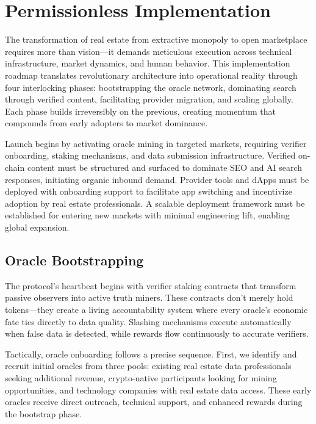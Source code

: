 \chapter{Permissionless Implementation}

The transformation of real estate from extractive monopoly to open marketplace requires more than vision---it demands meticulous execution across technical infrastructure, market dynamics, and human behavior. This implementation roadmap translates revolutionary architecture into operational reality through four interlocking phases: bootstrapping the oracle network, dominating search through verified content, facilitating provider migration, and scaling globally. Each phase builds irreversibly on the previous, creating momentum that compounds from early adopters to market dominance.

Launch begins by activating oracle mining in targeted markets, requiring verifier onboarding, staking mechanisms, and data submission infrastructure. Verified on-chain content must be structured and surfaced to dominate SEO and AI search responses, initiating organic inbound demand. Provider tools and dApps must be deployed with onboarding support to facilitate app switching and incentivize adoption by real estate professionals. A scalable deployment framework must be established for entering new markets with minimal engineering lift, enabling global expansion.

\section{Oracle Bootstrapping}

The protocol's heartbeat begins with verifier staking contracts that transform passive observers into active truth miners. These contracts don't merely hold tokens---they create a living accountability system where every oracle's economic fate ties directly to data quality. Slashing mechanisms execute automatically when false data is detected, while rewards flow continuously to accurate verifiers.

Tactically, oracle onboarding follows a precise sequence. First, we identify and recruit initial oracles from three pools: existing real estate data professionals seeking additional revenue, crypto-native participants looking for mining opportunities, and technology companies with real estate data access. These early oracles receive direct outreach, technical support, and enhanced rewards during the bootstrap phase.


